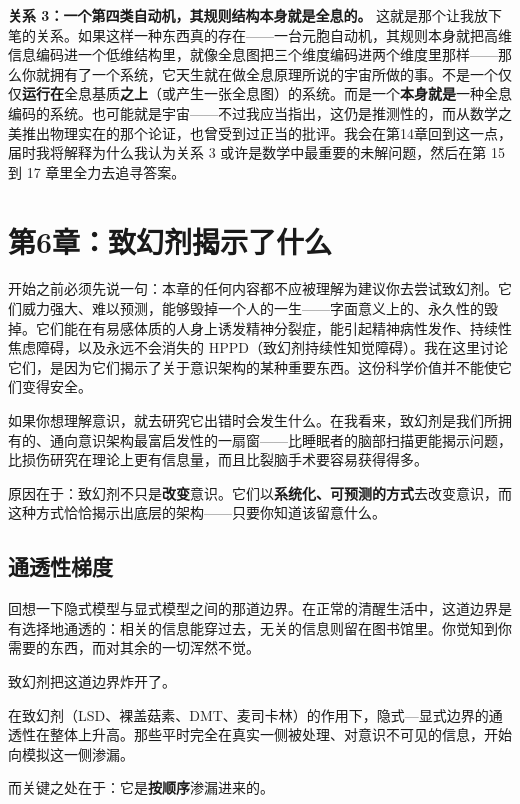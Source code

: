 \documentclass[11pt, twoside, openright]{book}
\begin{document}
\textbf{关系 3：一个第四类自动机，其规则结构本身就是全息的。} 这就是那个让我放下笔的关系。如果这样一种东西真的存在------一台元胞自动机，其规则本身就把高维信息编码进一个低维结构里，就像全息图把三个维度编码进两个维度里那样------那么你就拥有了一个系统，它天生就在做全息原理所说的宇宙所做的事。不是一个仅仅\textbf{运行在}全息基质\textbf{之上}（或产生一张全息图）的系统。而是一个\textbf{本身就是}一种全息编码的系统。也可能就是宇宙------不过我应当指出，这仍是推测性的，而从数学之美推出物理实在的那个论证，也曾受到过正当的批评。我会在第14章回到这一点，届时我将解释为什么我认为关系 3 或许是数学中最重要的未解问题，然后在第 15 到 17 章里全力去追寻答案。


\chapter*{第6章：致幻剂揭示了什么}

开始之前必须先说一句：本章的任何内容都不应被理解为建议你去尝试致幻剂。它们威力强大、难以预测，能够毁掉一个人的一生------字面意义上的、永久性的毁掉。它们能在有易感体质的人身上诱发精神分裂症，能引起精神病性发作、持续性焦虑障碍，以及永远不会消失的 HPPD（致幻剂持续性知觉障碍）。我在这里讨论它们，是因为它们揭示了关于意识架构的某种重要东西。这份科学价值并不能使它们变得安全。

如果你想理解意识，就去研究它出错时会发生什么。在我看来，致幻剂是我们所拥有的、通向意识架构最富启发性的一扇窗------比睡眠者的脑部扫描更能揭示问题，比损伤研究在理论上更有信息量，而且比裂脑手术要容易获得得多。

原因在于：致幻剂不只是\textbf{改变}意识。它们以\textbf{系统化、可预测的方式}去改变意识，而这种方式恰恰揭示出底层的架构------只要你知道该留意什么。

\section*{通透性梯度}

回想一下隐式模型与显式模型之间的那道边界。在正常的清醒生活中，这道边界是有选择地通透的：相关的信息能穿过去，无关的信息则留在图书馆里。你觉知到你需要的东西，而对其余的一切浑然不觉。

致幻剂把这道边界炸开了。

在致幻剂（LSD、裸盖菇素、DMT、麦司卡林）的作用下，隐式---显式边界的通透性在整体上升高。那些平时完全在真实一侧被处理、对意识不可见的信息，开始向模拟这一侧渗漏。

而关键之处在于：它是\textbf{按顺序}渗漏进来的。
\end{document}
